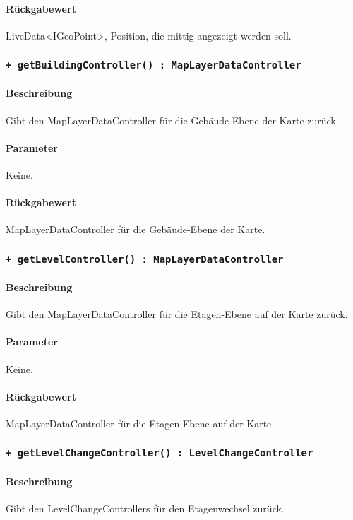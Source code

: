 \paragraph*{Rückgabewert}
LiveData<IGeoPoint>, Position, die mittig angezeigt werden soll.

\subsubsection*{\texttt{+ getBuildingController() : MapLayerDataController}}%
\paragraph*{Beschreibung}
Gibt den MapLayerDataController für die Gebäude-Ebene der Karte zurück.
\paragraph*{Parameter}
Keine.
\paragraph*{Rückgabewert}
MapLayerDataController für die Gebäude-Ebene der Karte.

\subsubsection*{\texttt{+ getLevelController() : MapLayerDataController}}%
\paragraph*{Beschreibung}
Gibt den MapLayerDataController für die Etagen-Ebene auf der Karte zurück.
\paragraph*{Parameter}
Keine.
\paragraph*{Rückgabewert}
MapLayerDataController für die Etagen-Ebene auf der Karte.

\subsubsection*{\texttt{+ getLevelChangeController() : LevelChangeController}}%
\paragraph*{Beschreibung}
Gibt den LevelChangeControllers für den Etagenwechsel zurück.
